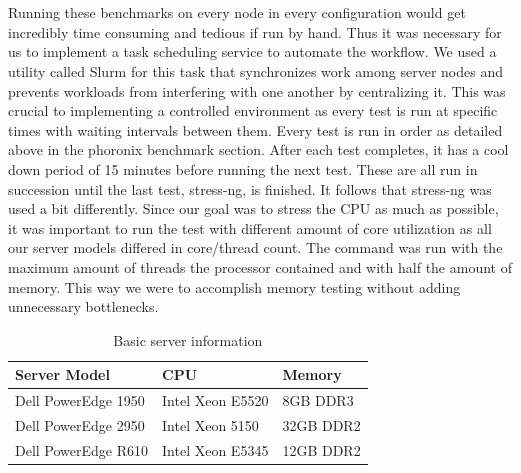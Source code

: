 \documentclass[sigconf]{acmart}
\begin{document}
\\\\
Running these benchmarks on every node in every configuration would get incredibly time consuming and tedious if run by hand. Thus it was necessary for us to implement a task scheduling service to automate the workflow. We used a utility called Slurm for this task that synchronizes work among server nodes and prevents workloads from interfering with one another by centralizing it. This was crucial to implementing a controlled environment as every test is run at specific times with waiting intervals between them. Every test is run in order as detailed above in the phoronix benchmark section. After each test completes,  it has a cool down period of 15 minutes before running the next test. These are all run in succession until the last test, stress-ng, is finished. It follows that stress-ng was used a bit differently. Since our goal was to stress the CPU as much as possible, it was important to run the test with different amount of core utilization as all our server models differed in core/thread count. The command was run with the maximum amount of threads the processor contained and with half the amount of memory. This way we were to accomplish memory testing without adding unnecessary bottlenecks.
\begin{table}
    \centering
    \begin{tabular}{|l|l|l|}
         \hline
         \textbf{Server Model} & \textbf{CPU} & \textbf{Memory} \\ \hline
         Dell PowerEdge 1950 & Intel Xeon E5520 & 8GB DDR3 \\ \hline
         Dell PowerEdge 2950 & Intel Xeon 5150 & 32GB DDR2 \\ \hline
         Dell PowerEdge R610 & Intel Xeon E5345 & 12GB DDR2 \\ \hline
    \end{tabular}
    \caption{Basic server information}
    \label{tab:my_label}
\end{table}
\end{document}
